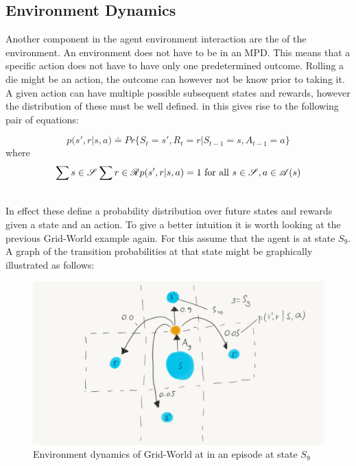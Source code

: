 \subsection{Environment Dynamics}\label{subsecec:env_dynam}

Another component in the agent environment interaction are the  of the environment. An environment does not have to be  in an MPD. This means that a specific action does not have to have only one predetermined outcome. Rolling a die might be an action, the outcome can however not be know prior to taking it. A given action can have multiple possible subsequent states and rewards, however the distribution of these must be well defined. in  this gives rise to the following pair of equations:

\begin{equation}\label{MDP:prob_dist:0}
    p(s', r |s, a) \doteq Pr\{ S_t=s', R_t=r | S_{t-1}=s, A_{t-1}=a\}
\end{equation}
where 
\begin{equation}\label{MDP:prob_dist:1}
    \sum{s \in \mathscr{S}}^{}\sum{r \in \mathscr{R}}^{}  p(s', r |s, a) = 1 \mathrm{\ for\ all\ } s \in \mathscr{S}, a \in \mathscr{A}(s) 
\end{equation}
\centerline{\small{}}

\noindent
\\ In effect these define a probability distribution over future states and rewards given a state and an action. To give a better intuition it is worth looking at the previous Grid-World example again. For this assume that the agent is at state $S_9$. A graph of the transition probabilities at that state might be graphically illustrated as follows:

\begin{figure}[h!]
    \centering
    \includegraphics[width=0.5\linewidth]{figures/mdp_dynamics.png}
    \caption{Environment dynamics of Grid-World at in an episode at state $S_9$}
    \label{fig:mdp_dynamics}
\end{figure}

